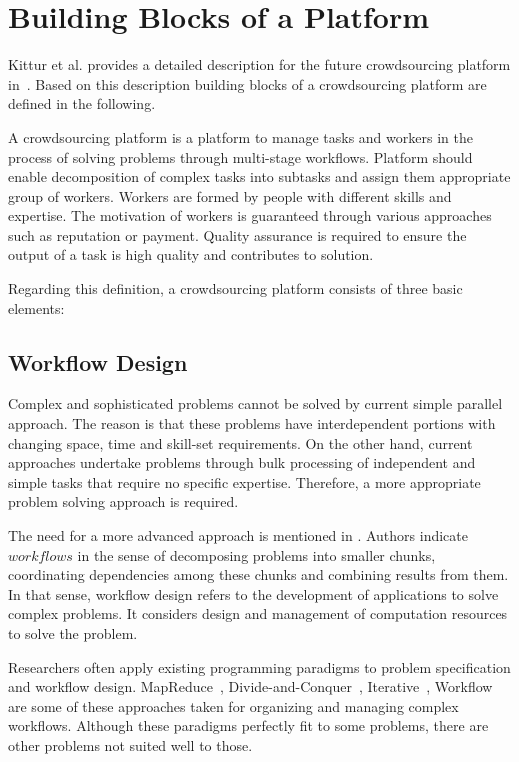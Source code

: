 \section{Building Blocks of a Platform}
Kittur et al. provides a detailed description for the future crowdsourcing platform 
in~\cite{Kittur2013}. Based on this description building blocks of a crowdsourcing 
platform are defined in the following.

A crowdsourcing platform is a platform to manage tasks and workers in the 
process of solving problems through multi-stage workflows. Platform should enable 
decomposition of complex tasks into subtasks and assign them appropriate group of 
workers. Workers are formed by people with different skills and expertise. The motivation 
of workers is guaranteed through various approaches 
such as reputation or payment. Quality assurance is required to ensure the output 
of a task is high quality and contributes to solution.

Regarding this definition, a crowdsourcing platform consists of three basic elements:

\subsection{Workflow Design}
Complex and sophisticated problems cannot be solved by current simple parallel 
approach. The reason is that these problems have interdependent portions with 
changing space, time and skill-set requirements. On the other hand, current 
approaches undertake problems through bulk processing of independent 
and simple tasks that require no specific expertise. Therefore, a more appropriate 
problem solving approach is required.

The need for a more advanced approach is mentioned in \cite{Kittur2013}. Authors 
indicate $workflows$ in the sense of decomposing problems into smaller chunks, 
coordinating dependencies among these chunks and combining results from them. 
In that sense, workflow design refers to the development of applications to solve 
complex problems. It considers design and management of computation resources 
to solve the problem.

Researchers often apply existing programming paradigms to problem specification 
and workflow design. MapReduce~\cite{Kittur2011, Ahmad2011}, 
Divide-and-Conquer~\cite{Kulkarni2012}, 
Iterative~\cite{Little2009}, 
Workflow ~\cite{Kokciyan2012} are some of these approaches taken for 
organizing and managing complex workflows. Although these paradigms 
perfectly fit to some problems, there are other problems not suited well to those. 


